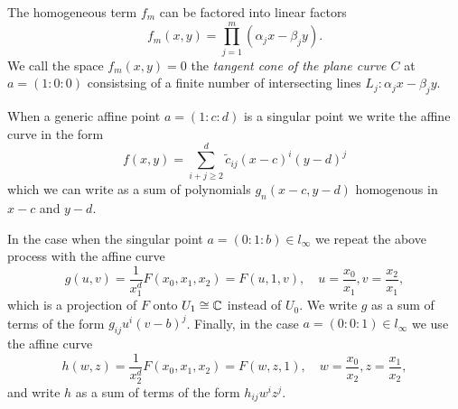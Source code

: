 The homogeneous term $f_m$ can be factored into linear factors
\[
  f_m(x,y) = \prod_{j=1}^m (\alpha_j x - \beta_j y).
\]
We call the space $f_m(x,y) = 0$ the {\it tangent cone of the plane
  curve $C$} at $a = (1 : 0 : 0)$ consistsing of a finite number of
intersecting lines $L_j : \alpha_j x - \beta_j y$.

When a generic affine point $a = (1 : c : d)$ is a singular point we
write the affine curve in the form
\[
    f(x,y) = \sum_{i+j \geq 2}^d \tilde{c}_{ij} (x-c)^i(y-d)^j
\]
which we can write as a sum of polynomials $g_n(x-c,y-d)$ homogenous in
$x-c$ and $y-d$.

In the case when the singular point $a = (0 : 1 : b) \in l_\infty$ we
repeat the above process with the affine curve
\[
    g(u,v) = \frac{1}{x_1^d} F(x_0, x_1, x_2) = F(u,1,v),
    \quad u = \frac{x_0}{x_1}, v = \frac{x_2}{x_1},
\]
which is a projection of $F$ onto $U_1 \cong \operatorname{\mathbb{C}}$ instead of $U_0$.  We
write $g$ as a sum of terms of the form $g_{ij}u^i(v-b)^j$. Finally, in
the case $a = (0 : 0 : 1) \in l_\infty$ we use the affine curve
\[
    h(w,z) = \frac{1}{x_2^d} F(x_0, x_1, x_2) = F(w,z,1),
    \quad w = \frac{x_0}{x_2}, z = \frac{x_1}{x_2},
\]
and write $h$ as a sum of terms of the form $h_{ij}w^iz^j$.

